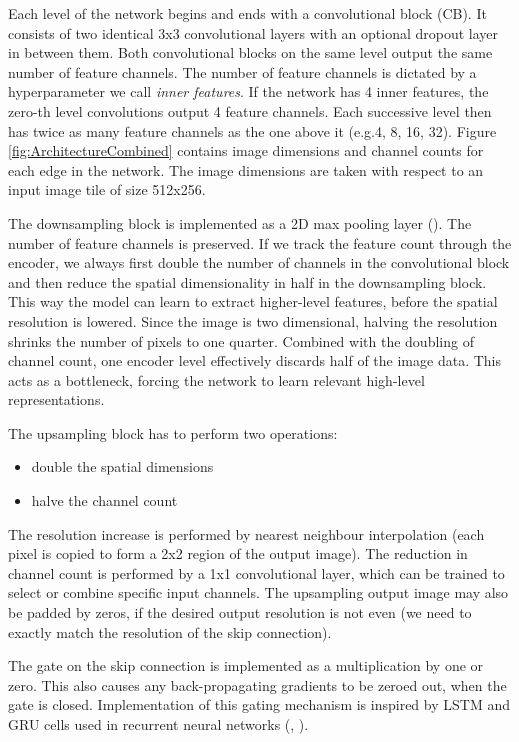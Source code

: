Each level of the network begins and ends with a convolutional block (CB). It consists of two identical 3x3 convolutional layers with an optional dropout layer in between them. Both convolutional blocks on the same level output the same number of feature channels. The number of feature channels is dictated by a hyperparameter we call \emph{inner features}. If the network has 4 inner features, the zero-th level convolutions output 4 feature channels. Each successive level then has twice as many feature channels as the one above it (e.g.\@ 4, 8, 16, 32). Figure \ref{fig:ArchitectureCombined} contains image dimensions and channel counts for each edge in the network. The image dimensions are taken with respect to an input image tile of size 512x256.

The downsampling block is implemented as a 2D max pooling layer (\cite{DeepLearningBook}). The number of feature channels is preserved. If we track the feature count through the encoder, we always first double the number of channels in the convolutional block and then reduce the spatial dimensionality in half in the downsampling block. This way the model can learn to extract higher-level features, before the spatial resolution is lowered. Since the image is two dimensional, halving the resolution shrinks the number of pixels to one quarter. Combined with the doubling of channel count, one encoder level effectively discards half of the image data. This acts as a bottleneck, forcing the network to learn relevant high-level representations.

The upsampling block has to perform two operations:

\begin{itemize}
    \item double the spatial dimensions
    \item halve the channel count
\end{itemize}

The resolution increase is performed by nearest neighbour interpolation (each pixel is copied to form a 2x2 region of the output image). The reduction in channel count is performed by a 1x1 convolutional layer, which can be trained to select or combine specific input channels. The upsampling output image may also be padded by zeros, if the desired output resolution is not even (we need to exactly match the resolution of the skip connection).

The gate on the skip connection is implemented as a multiplication by one or zero. This also causes any back-propagating gradients to be zeroed out, when the gate is closed. Implementation of this gating mechanism is inspired by LSTM and GRU cells used in recurrent neural networks (\cite{LSTM}, \cite{GRU}).


